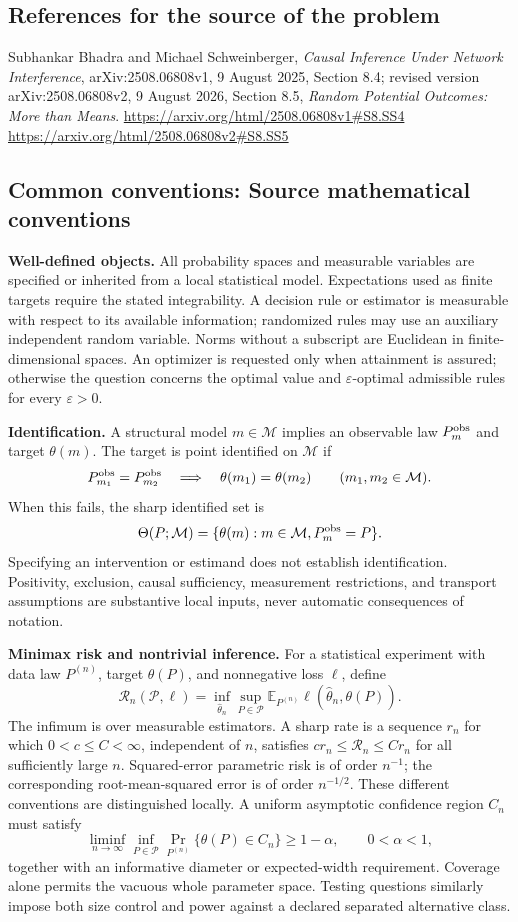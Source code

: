 \documentclass[11pt,a4paper]{article}
\newcommand{\E}{\mathbb E}
\begin{document}
\subsection*{References for the source of the problem}
Subhankar Bhadra and Michael Schweinberger, \emph{Causal Inference Under Network Interference}, arXiv:2508.06808v1, 9 August 2025, Section 8.4; revised version arXiv:2508.06808v2, 9 August 2026, Section 8.5, \emph{Random Potential Outcomes: More than Means}.
\url{https://arxiv.org/html/2508.06808v1#S8.SS4}
\url{https://arxiv.org/html/2508.06808v2#S8.SS5}

\subsection*{Common conventions: Source mathematical conventions}

\textbf{Well-defined objects.}
All probability spaces and measurable variables are specified or inherited
from a local statistical model. Expectations used as finite targets require
the stated integrability. A decision rule or estimator is measurable with
respect to its available information; randomized rules may use an auxiliary
independent random variable. Norms without a subscript are Euclidean in
finite-dimensional spaces. An optimizer is requested only when attainment
is assured; otherwise the question concerns the optimal value and
$\varepsilon$-optimal admissible rules for every $\varepsilon>0$.

\textbf{Identification.}
A structural model $m\in\mathcal M$ implies an observable law
$P_m^{\rm obs}$ and target $\theta(m)$. The target is point identified on
$\mathcal M$ if
\[
 P_{m_1}^{\rm obs}=P_{m_2}^{\rm obs}
 \quad\Longrightarrow\quad\theta(m_1)=\theta(m_2)
 \qquad(m_1,m_2\in\mathcal M).
\]
When this fails, the sharp identified set is
\[
 \Theta(P;\mathcal M)=\{\theta(m):m\in\mathcal M,
                                  P_m^{\rm obs}=P\}.
\]
Specifying an intervention or estimand does not establish identification.
Positivity, exclusion, causal sufficiency, measurement restrictions, and
transport assumptions are substantive local inputs, never automatic
consequences of notation.

\textbf{Minimax risk and nontrivial inference.}
For a statistical experiment with data law $P^{(n)}$, target $\theta(P)$,
and nonnegative loss $\ell$, define
\[
 \mathcal R_n(\mathcal P,\ell)
   =\inf_{\widehat\theta_n}\sup_{P\in\mathcal P}
      \E_{P^{(n)}}\ell(\widehat\theta_n,\theta(P)).
\]
The infimum is over measurable estimators. A sharp rate is a sequence
$r_n$ for which $0<c\leq C<\infty$, independent of $n$, satisfies
$c r_n\leq\mathcal R_n\leq C r_n$ for all sufficiently large $n$.
Squared-error parametric risk is of order $n^{-1}$; the corresponding
root-mean-squared error is of order $n^{-1/2}$. These different conventions
are distinguished locally. A uniform asymptotic confidence region $C_n$
must satisfy
\[
 \liminf_{n\to\infty}\inf_{P\in\mathcal P}
     \Pr_{P^{(n)}}\{\theta(P)\in C_n\}\geq 1-\alpha,
 \qquad 0<\alpha<1,
\]
together with an informative diameter or expected-width requirement.
Coverage alone permits the vacuous whole parameter space. Testing questions
similarly impose both size control and power against a declared separated
alternative class.
\end{document}

